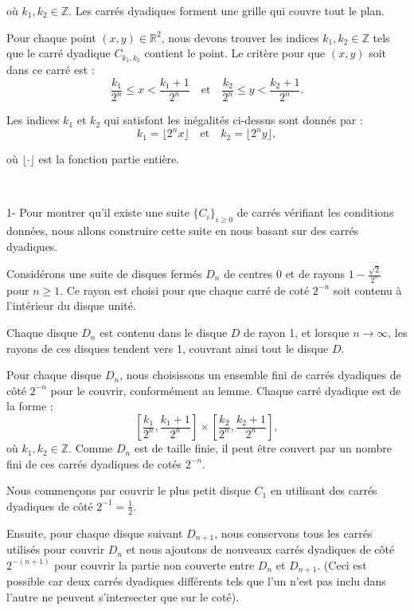 o{\`u} $k_1, k_2 \in \mathbb{Z}$. Les carr{\'e}s dyadiques forment une grille
qui couvre tout le plan.

Pour chaque point $(x, y) \in \mathbb{R}^2$, nous devons trouver les indices
$k_1, k_2 \in \mathbb{Z}$ tels que le carr{\'e} dyadique $C_{k_1, k_2}$
contient le point. Le crit{\`e}re pour que $(x, y)$ soit dans ce carr{\'e} est
:
\[ \frac{k_1}{2^n} \leq x < \frac{k_1 + 1}{2^n}  \quad \text{et} \quad
   \frac{k_2}{2^n} \leq y < \frac{k_2 + 1}{2^n} . \]


Les indices $k_1$ et $k_2$ qui satisfont les in{\'e}galit{\'e}s ci-dessus sont
donn{\'e}s par :
\[ k_1 = \lfloor 2^n x \rfloor  \quad \text{et} \quad k_2 = \lfloor 2^n y
   \rfloor, \]


o{\`u} $\lfloor \cdot \rfloor$ est la fonction partie enti{\`e}re.

\

1- Pour montrer qu'il existe une suite $\{C_i \}_{i \geq 0}$ de carr{\'e}s
v{\'e}rifiant les conditions donn{\'e}es, nous allons construire cette suite
en nous basant sur des carr{\'e}s dyadiques.

Consid{\'e}rons une suite de disques ferm{\'e}s $D_n$ de centres $0$ et de
rayons $1 - \frac{\sqrt{2}}{2^n}$ pour $n \geq 1$. Ce rayon est choisi pour
que chaque carr{\'e} de cot{\'e} $2^{- n}$ soit contenu {\`a} l'int{\'e}rieur
du disque unit{\'e}.

Chaque disque $D_n$ est contenu dans le disque $D$ de rayon 1, et lorsque $n
\to \infty$, les rayons de ces disques tendent vers 1, couvrant ainsi tout le
disque $D$.

Pour chaque disque $D_n$, nous choisissons un ensemble fini de carr{\'e}s
dyadiques de c{\^o}t{\'e} $2^{- n}$ pour le couvrir, conform{\'e}ment au
lemme. Chaque carr{\'e} dyadique est de la forme :
\[ \left[ \frac{k_1}{2^n}, \frac{k_1 + 1}{2^n} \right] \times \left[
   \frac{k_2}{2^n}, \frac{k_2 + 1}{2^n} \right], \]
o{\`u} $k_1, k_2 \in \mathbb{Z}$. Comme $D_n$ est de taille finie, il peut
{\^e}tre couvert par un nombre fini de ces carr{\'e}s dyadiques de cot{\'e}s
$2^{- n}$.

Nous commen{\c c}ons par couvrir le plus petit disque $C_1$ en utilisant des
carr{\'e}s dyadiques de c{\^o}t{\'e} $2^{- 1} = \frac{1}{2}$.

Ensuite, pour chaque disque suivant $D_{n + 1}$, nous conservons tous les
carr{\'e}s utilis{\'e}s pour couvrir $D_n$ et nous ajoutons de nouveaux
carr{\'e}s dyadiques de c{\^o}t{\'e} $2^{- (n + 1)}$ pour couvrir la partie
non couverte entre $D_n$ et $D_{n + 1}$. (Ceci est possible car deux
carr{\'e}s dyadiques diff{\'e}rents tels que l'un n'est pas inclu dans l'autre
ne peuvent s'intersecter que sur le cot{\'e}).


